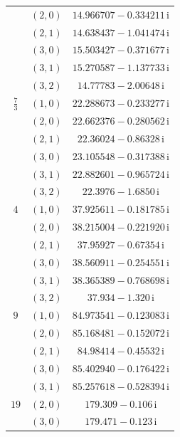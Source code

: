 \begin{table}[H]
\begin{minipage}[t]{0.325\textwidth}
\begin{tabular}[t]{|c|c|c|}
 & $(2,0)$ & $14.966707-0.334211\,\mathrm{i}$ \\
 & $(2,1)$ & $14.638437-1.041474\,\mathrm{i}$ \\
 & $(3,0)$ & $15.503427-0.371677\,\mathrm{i}$ \\
 & $(3,1)$ & $15.270587-1.137733\,\mathrm{i}$ \\
 & $(3,2)$ & $14.77783-2.00648\,\mathrm{i}$ \\
\hline
$\tfrac73$ & $(1,0)$ & $22.288673-0.233277\,\mathrm{i}$ \\
 & $(2,0)$ & $22.662376-0.280562\,\mathrm{i}$ \\
 & $(2,1)$ & $22.36024-0.86328\,\mathrm{i}$ \\
 & $(3,0)$ & $23.105548-0.317388\,\mathrm{i}$ \\
 & $(3,1)$ & $22.882601-0.965724\,\mathrm{i}$ \\
 & $(3,2)$ & $22.3976-1.6850\,\mathrm{i}$ \\
\hline
$4$ & $(1,0)$ & $37.925611-0.181785\,\mathrm{i}$ \\
 & $(2,0)$ & $38.215004-0.221920\,\mathrm{i}$ \\
 & $(2,1)$ & $37.95927-0.67354\,\mathrm{i}$ \\
 & $(3,0)$ & $38.560911-0.254551\,\mathrm{i}$ \\
 & $(3,1)$ & $38.365389-0.768698\,\mathrm{i}$ \\
 & $(3,2)$ & $37.934-1.320\,\mathrm{i}$ \\
\hline
$9$ & $(1,0)$ & $84.973541-0.123083\,\mathrm{i}$ \\
 & $(2,0)$ & $85.168481-0.152072\,\mathrm{i}$ \\
 & $(2,1)$ & $84.98414-0.45532\,\mathrm{i}$ \\
 & $(3,0)$ & $85.402940-0.176422\,\mathrm{i}$ \\
 & $(3,1)$ & $85.257618-0.528394\,\mathrm{i}$ \\
\hline
$19$ & $(2,0)$ & $179.309-0.106\,\mathrm{i}$ \\
 & $(3,0)$ & $179.471-0.123\,\mathrm{i}$ \\
\hline
\end{tabular}
\end{minipage}
\endgroup
\end{table}

